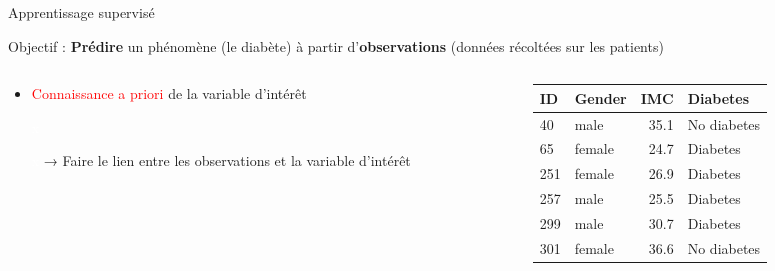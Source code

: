 \begin{frame}{Apprentissage supervisé}

  \begin{center}
  \end{center}
 
  \bigskip
  Objectif : \textbf{Prédire} un phénomène (le diabète) à partir d'\textbf{observations} (données récoltées sur les patients)
  \bigskip

  \begin{overprint}
  \begin{columns}
    \begin{column}{.48\textwidth}
      \begin{itemize}
        \item \textcolor{red}{Connaissance a priori} de la variable d'intérêt
        \item[\textcolor{white}{x}]
        \item[\textcolor{white}{x}] → Faire le lien entre les observations et la variable d'intérêt
      \end{itemize}
    \end{column}    
    
    \begin{column}{.48\textwidth}
      
      {
        \scriptsize
        \begin{tabular}{llrl}
          \toprule
          ID &  Gender &   IMC &     Diabetes \\
          \midrule
          40             &    male &  35.1 &  No diabetes \\
          65             &  female &  24.7 &     Diabetes \\
          251            &  female &  26.9 &     Diabetes \\
          257            &    male &  25.5 &     Diabetes \\
          299            &    male &  30.7 &     Diabetes \\
          301            &  female &  36.6 &  No diabetes \\
          \bottomrule
        \end{tabular}
      }
    \end{column}
  \end{columns}


\end{overprint}
\end{frame}
